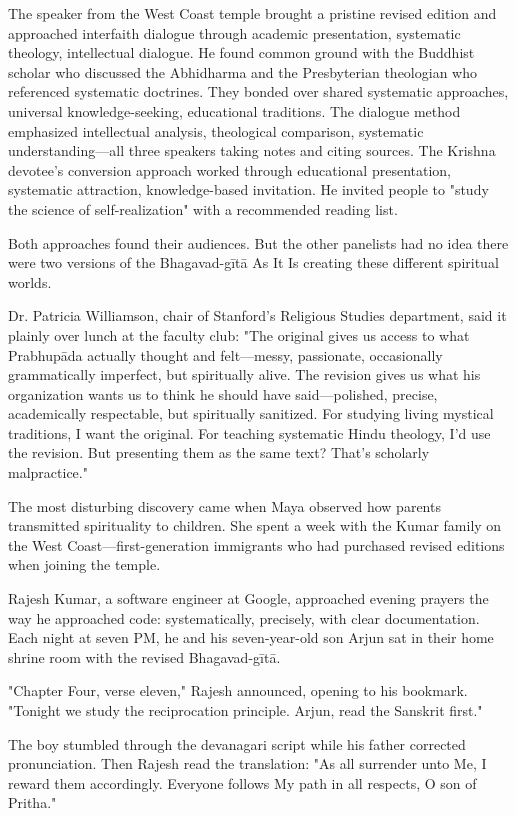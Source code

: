\documentclass[12pt,twoside]{book}
\begin{document}
The speaker from the West Coast temple brought a pristine revised edition and approached interfaith dialogue through academic presentation, systematic theology, intellectual dialogue. He found common ground with the Buddhist scholar who discussed the Abhidharma and the Presbyterian theologian who referenced systematic doctrines. They bonded over shared systematic approaches, universal knowledge-seeking, educational traditions. The dialogue method emphasized intellectual analysis, theological comparison, systematic understanding—all three speakers taking notes and citing sources. The Krishna devotee's conversion approach worked through educational presentation, systematic attraction, knowledge-based invitation. He invited people to "study the science of self-realization" with a recommended reading list.

Both approaches found their audiences. But the other panelists had no idea there were two versions of the Bhagavad-gītā As It Is creating these different spiritual worlds.

Dr. Patricia Williamson, chair of Stanford's Religious Studies department, said it plainly over lunch at the faculty club: "The original gives us access to what Prabhupāda actually thought and felt—messy, passionate, occasionally grammatically imperfect, but spiritually alive. The revision gives us what his organization wants us to think he should have said—polished, precise, academically respectable, but spiritually sanitized. For studying living mystical traditions, I want the original. For teaching systematic Hindu theology, I'd use the revision. But presenting them as the same text? That's scholarly malpractice."

The most disturbing discovery came when Maya observed how parents transmitted spirituality to children. She spent a week with the Kumar family on the West Coast—first-generation immigrants who had purchased revised editions when joining the temple.

Rajesh Kumar, a software engineer at Google, approached evening prayers the way he approached code: systematically, precisely, with clear documentation. Each night at seven PM, he and his seven-year-old son Arjun sat in their home shrine room with the revised Bhagavad-gītā.

"Chapter Four, verse eleven," Rajesh announced, opening to his bookmark. "Tonight we study the reciprocation principle. Arjun, read the Sanskrit first."

The boy stumbled through the devanagari script while his father corrected pronunciation. Then Rajesh read the translation: "As all surrender unto Me, I reward them accordingly. Everyone follows My path in all respects, O son of Pritha."
\end{document}
